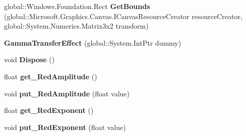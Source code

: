 \begin{DoxyCompactItemize}
\item 
\mbox{\label{class_microsoft_1_1_graphics_1_1_canvas_1_1_effects_1_1_gamma_transfer_effect_aa2d831514986da053da0423c9f99c841}} 
global\+::\+Windows.\+Foundation.\+Rect {\bfseries Get\+Bounds} (global\+::\+Microsoft.\+Graphics.\+Canvas.\+I\+Canvas\+Resource\+Creator resource\+Creator, global\+::\+System.\+Numerics.\+Matrix3x2 transform)
\item 
\mbox{\label{class_microsoft_1_1_graphics_1_1_canvas_1_1_effects_1_1_gamma_transfer_effect_acc80116adac830c588156332a0cbd9ec}} 
{\bfseries Gamma\+Transfer\+Effect} (global\+::\+System.\+Int\+Ptr dummy)
\item 
\mbox{\label{class_microsoft_1_1_graphics_1_1_canvas_1_1_effects_1_1_gamma_transfer_effect_a83bd3bcd2df4a6ade3ee108a25f92ac9}} 
void {\bfseries Dispose} ()
\item 
\mbox{\label{class_microsoft_1_1_graphics_1_1_canvas_1_1_effects_1_1_gamma_transfer_effect_ab74b1133eab4608c72e6c33e50c14a99}} 
float {\bfseries get\+\_\+\+Red\+Amplitude} ()
\item 
\mbox{\label{class_microsoft_1_1_graphics_1_1_canvas_1_1_effects_1_1_gamma_transfer_effect_ac877c0c4b86a5c1e90056a92dad7a161}} 
void {\bfseries put\+\_\+\+Red\+Amplitude} (float value)
\item 
\mbox{\label{class_microsoft_1_1_graphics_1_1_canvas_1_1_effects_1_1_gamma_transfer_effect_a744bfb7361792b436940014b783e3f6c}} 
float {\bfseries get\+\_\+\+Red\+Exponent} ()
\item 
\mbox{\label{class_microsoft_1_1_graphics_1_1_canvas_1_1_effects_1_1_gamma_transfer_effect_a8969e3ad451992d1f43567df17274e07}} 
void {\bfseries put\+\_\+\+Red\+Exponent} (float value)

\end{DoxyCompactItemize}

